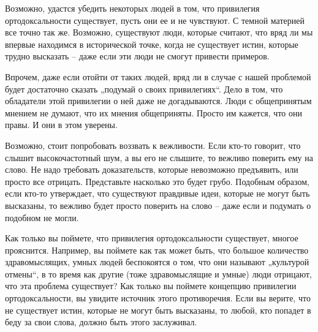 \documentclass[ebook,12pt,oneside,openany]{memoir}
\begin{document}
Возможно, удастся убедить некоторых людей в том, что привилегия
ортодоксальности существует, пусть они ее и не чувствуют. С темной
материей все точно так же. Возможно, существуют люди, которые считают,
что вряд ли мы впервые находимся в исторической точке, когда не
существует истин, которые трудно высказать – даже если эти люди не
смогут привести примеров.

Впрочем, даже если отойти от таких людей, вряд ли в случае с нашей
проблемой будет достаточно сказать „подумай о своих привилегиях“. Дело
в том, что обладатели этой привилегии о ней даже не догадываются. Люди
с общепринятым мнением не думают, что их мнения общеприняты. Просто им
кажется, что они правы. И они в этом уверены.

Возможно, стоит попробовать воззвать к вежливости. Если кто-то
говорит, что слышит высокочастотный шум, а вы его не слышите, то
вежливо поверить ему на слово. Не надо требовать доказательств,
которые невозможно предъявить, или просто все отрицать. Представьте
насколько это будет грубо. Подобным образом, если кто-то утверждает,
что существуют правдивые идеи, которые не могут быть высказаны, то
вежливо будет просто поверить на слово – даже если и подумать о
подобном не могли.

Как только вы поймете, что привилегия ортодоксальности существует,
многое прояснится. Например, вы поймете как так может быть, что
большое количество здравомыслящих, умных людей беспокоятся о том, что
они называют „культурой отмены“, в то время как другие (тоже
здравомыслящие и умные) люди отрицают, что эта проблема существует?
Как только вы поймете концепцию привилегии ортодоксальности, вы
увидите источник этого противоречия. Если вы верите, что не существует
истин, которые не могут быть высказаны, то любой, кто попадет в беду
за свои слова, должно быть этого заслуживал.
\end{document}

